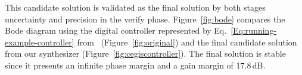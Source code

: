 \documentclass[final]{sig-alternate-05-2015}
\newcommand{\blue}[1]{{\color{blue}#1}}
\begin{document}
This candidate solution is validated  as the final solution by both stages
{\sc uncertainty} and {\sc precision} in the {\sc verify} phase. 
Figure~\ref{fig:bode} compares the Bode diagram using the digital controller 
represented by Eq.~\eqref{Eq:running-example-controller}
from~\cite{DBLP:conf/hybrid/WangGRJF16} (Figure~\ref{fig:original}) and the
final candidate solution from our synthesizer
(Figure~\ref{fig:cegiscontroller}).  The \tool final solution is stable
since it presents an infinite phase margin and a gain margin of $17.8$\,dB.




\end{document}
